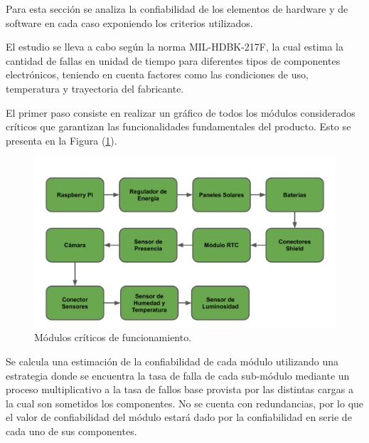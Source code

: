 %

%

Para esta sección se analiza la confiabilidad de los elementos de hardware y de software en cada caso exponiendo los criterios utilizados.

El estudio se lleva a cabo según la norma MIL-HDBK-217F, la cual estima la cantidad de fallas en unidad de tiempo para diferentes tipos de componentes electrónicos, teniendo en cuenta factores como las condiciones de uso, temperatura y trayectoria del fabricante.

El primer paso consiste en realizar un gráfico de todos los módulos considerados críticos que garantizan las funcionalidades fundamentales del producto. Esto se presenta en la Figura (\ref{fig:criticos}).

\begin{figure}[H]
	\centering
	\includegraphics[width=0.9\linewidth,page=1]{ImagenesEstudios/ModulosCriticos}		
	\caption{Módulos críticos de funcionamiento.}
	\label{fig:criticos}
\end{figure}
Se calcula una estimación de la confiabilidad de cada módulo utilizando una estrategia  donde se encuentra la tasa de falla de cada sub-módulo mediante un proceso multiplicativo a la tasa de fallos base provista por las distintas cargas a la cual son sometidos los componentes.
No se cuenta con redundancias, por lo que el valor de confiabilidad del módulo estará dado por la confiabilidad en serie de cada uno de sus componentes.

